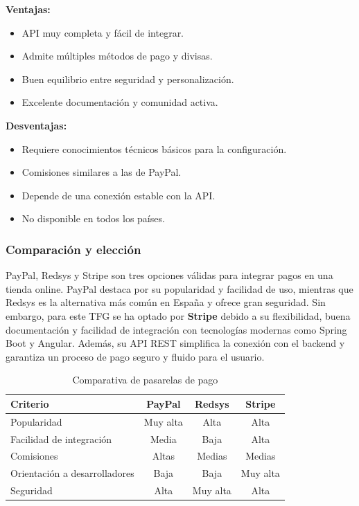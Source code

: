 \textbf{Ventajas:}
\begin{itemize}
    \item API muy completa y fácil de integrar.
    \item Admite múltiples métodos de pago y divisas.
    \item Buen equilibrio entre seguridad y personalización.
    \item Excelente documentación y comunidad activa.
\end{itemize}

\textbf{Desventajas:}
\begin{itemize}
    \item Requiere conocimientos técnicos básicos para la configuración.
    \item Comisiones similares a las de PayPal.
    \item Depende de una conexión estable con la API.
    \item No disponible en todos los países.
\end{itemize}


\subsubsection{Comparación y elección}
PayPal, Redsys y Stripe son tres opciones válidas para integrar pagos en una tienda online. PayPal destaca por su popularidad y facilidad de uso, mientras que Redsys es la alternativa más común en España y ofrece gran seguridad. Sin embargo, para este TFG se ha optado por \textbf{Stripe} debido a su flexibilidad, buena documentación y facilidad de integración con tecnologías modernas como Spring Boot y Angular. Además, su API REST simplifica la conexión con el backend y garantiza un proceso de pago seguro y fluido para el usuario.

\begin{table}[H]
\centering
\begin{tabular}{|l|c|c|c|}
\hline
\textbf{Criterio} & \textbf{PayPal} & \textbf{Redsys} & \textbf{Stripe} \\ \hline
Popularidad & Muy alta & Alta & Alta \\ \hline
Facilidad de integración & Media & Baja & Alta \\ \hline
Comisiones & Altas & Medias & Medias \\ \hline
Orientación a desarrolladores & Baja & Baja & Muy alta \\ \hline
Seguridad & Alta & Muy alta & Alta \\ \hline
\end{tabular}
\caption{Comparativa de pasarelas de pago}
\end{table}


